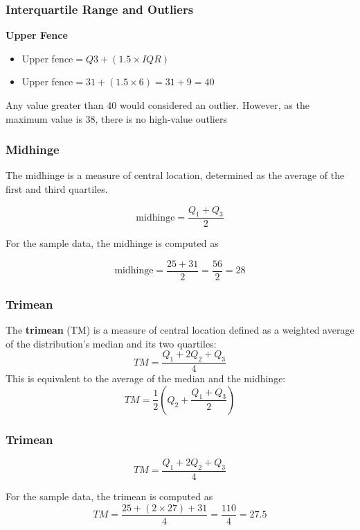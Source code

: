 \documentclass{beamer}
\begin{document}
\begin{frame}
\frametitle{Interquartile Range and Outliers}
\Large
\textbf{Upper Fence}
\begin{itemize}
\item Upper fence$ = Q3 + (1.5 \times IQR)$
\item Upper fence$= 31 + (1.5\times 6) = 31 + 9 = 40$
\end{itemize}

Any value greater than 40 would considered an outlier. However, as the maximum value is 38, there is no high-value outliers

\end{frame}
\begin{frame}
\frametitle{Midhinge}
\Large
The midhinge is a measure of central location, determined as the average of the first and third quartiles.

\[  \mbox{midhinge} = \frac{Q_1 + Q_3}{2}\]

For the sample data, the midhinge is computed as

\[  \mbox{midhinge} = \frac{25 + 31}{2} = \frac{56}{2} = 28 \]


\end{frame}
\begin{frame}
\frametitle{Trimean}
\Large
The \textbf{trimean} (TM) is a measure of central location defined as a weighted average of the distribution's median and its two quartiles:
\[TM= \frac{Q_1 + 2Q_2 + Q_3}{4}\]
This is equivalent to the average of the median and the midhinge:
\[TM= \frac{1}{2}\left(Q_2 + \frac{Q_1 + Q_3}{2}\right)\]

\end{frame}
\begin{frame}
\frametitle{Trimean}
\Large
\[TM= \frac{Q_1 + 2Q_2 + Q_3}{4}\]

For the sample data, the trimean is computed as
\[TM= \frac{25 + (2\times 27) + 31}{4} = \frac{110}{4} = 27.5\]

\end{frame}
\begin{frame}

\end{frame}
\end{document}
